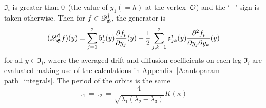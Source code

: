 $\mathfrak{I}_i$ is greater than $0$~(the value of $y_1(=h)$ at the
vertex~${\mathcal{O}}$) and the `$-$' sign is taken otherwise. Then for $f\in
\mathscr{D}_\mathfrak G^\dagger$, the generator is
\begin{equation}
(\mathscr L^\dagger_\mathfrak G f)(y) = \sum_{j=1}^2 \mathfrak{b}_j^i(y) \frac{\partial f_i}{\partial y_j}(y) + \frac12 \sum_{j,k=1}^2 \mathfrak a_{jk}^i(y) \frac{\partial^2 f_i}{\partial y_j \partial y_k}(y)
\label{E:gen-graph}
\end{equation}
for all $y \in \bar{\mathfrak I}_i$, where the averaged drift and
diffusion coefficients on each leg $\mathfrak I_i$ are evaluated
making use of the calculations in Appendix~\ref{A:autoparam
path_integrals}. The period of the orbits is the same
\[
\period_1 = \period_2 = \frac{4}{\sqrt{\lambda_1 (\lambda_2 - \lambda_3)}} K(\kappa)
\]
